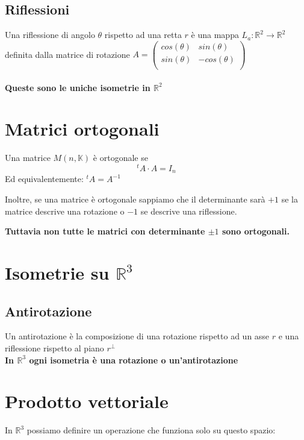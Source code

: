 \documentclass[a4paper, 10pt]{article}
\begin{document}
\subsection{Riflessioni}

Una riflessione di angolo $\theta$ rispetto ad una retta $r$ è una mappa $L_a: \mathbb{R}^2 \rightarrow \mathbb{R}^2$ definita dalla matrice di rotazione $A=\left(\begin{matrix}cos\left(\theta\right)&sin\left(\theta\right)\\sin\left(\theta\right)&-cos\left(\theta\right)\\\end{matrix}\right)
$
\\\\
\textbf{Queste sono le uniche isometrie in $\mathbb{R}^2$}

\section{Matrici ortogonali}

Una matrice $M(n, \mathbb{K})$ è ortogonale se
$$^t A \cdot A = I_n$$ Ed equivalentemente: $^tA = A^{-1}$

Inoltre, se una matrice è ortogonale sappiamo che il determinante sarà $+1$ se la matrice descrive una rotazione o $-1$ se descrive una riflessione.

\textbf{Tuttavia non tutte le matrici con determinante $\pm 1$ sono ortogonali.}

\section{Isometrie su $\mathbb{R}^3$}

\subsection{Antirotazione}

Un antirotazione è la composizione di una rotazione rispetto ad un asse $r$ e una riflessione rispetto al piano $r^\perp$
\\
\textbf{In $\mathbb{R}^3$ ogni isometria è una rotazione o un'antirotazione}

\section{Prodotto vettoriale}

In $\mathbb{R}^3$ possiamo definire un operazione che funziona solo su questo spazio:
\end{document}
